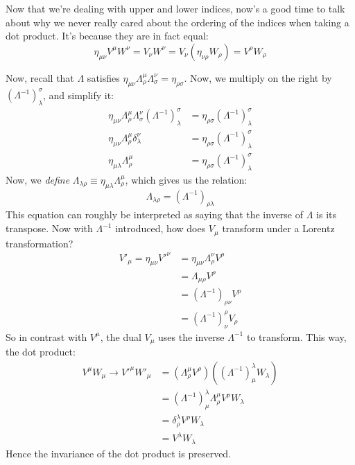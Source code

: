 \begin{aside}
	Now that we're dealing with upper and lower indices, now's a good time to talk about why we never really
	cared about the ordering of the indices when taking a dot product. It's because they are in fact equal:
	\[
		\eta_{\mu \nu} V^{\mu}W^{\nu} = V_{\nu}W^{\nu} = V_\nu(\eta_{\nu \rho} W_{\rho}) = V^{\rho}W_{\rho}
	\]
\end{aside}
Now, recall that \( \Lambda \) satisfies \( \eta_{\mu \nu} \Lambda^{\mu}_\rho \Lambda^{\nu}_{\sigma} =
\eta_{\rho \sigma} \). Now, we multiply on the right by \( (\Lambda^{-1})^{\sigma}_\lambda \), and simplify
it:
\begin{align*}
	\eta_{\mu \nu}\Lambda^{\mu}_{\rho}\Lambda^{\nu}_\sigma \left( \Lambda^{-1} \right)^{\sigma}_\lambda &=
	\eta_{\rho \sigma}\left( \Lambda^{-1} \right)^{\sigma}_\lambda\\
	\eta_{\mu \nu}\Lambda^{\mu}_\rho \delta^{\nu}_\lambda &= \eta_{\rho \sigma}
	\left(\Lambda^{-1}\right)^{\sigma}_\lambda\\
	\eta_{\mu \lambda} \Lambda^{\mu}_\rho &= \eta_{\rho \sigma}\left( \Lambda^{-1} \right)^{\sigma}_\lambda 
\end{align*}
Now, we \textit{define} \( \Lambda_{\lambda \rho} \equiv \eta_{\mu \lambda}\Lambda^{\mu}_\rho \), which gives
us the relation:
\begin{equation}
	\Lambda_{\lambda \rho} = \left( \Lambda^{-1} \right)_{\rho \lambda}
\end{equation}
This equation can roughly be interpreted as saying that the inverse of \( \Lambda \) is its transpose. Now
with \( \Lambda^{-1} \) introduced, how does \( V_{\mu} \) transform under a Lorentz transformation? 
\begin{align*}
	V'_{\mu} = \eta_{\mu \nu}V'^{\nu} &= \eta_{\mu \nu} \Lambda^{\nu}_\rho V^{\rho}\\
	&= \Lambda_{\mu \rho}V^{\rho} \\ 
	&= \left( \Lambda^{-1} \right)_{\rho \nu} V^{\rho} \\ 
	&= \left( \Lambda^{-1} \right)^{\rho}_\nu V_\rho
\end{align*}
So in contrast with \( V^{\mu} \), the dual \( V_{\mu} \) uses the inverse \( \Lambda^{-1} \) to transform.
This way, the dot product:
\begin{align*}
	V^{\mu}W_{\mu} \to V'^{\mu}W'_{\mu} &= \left( \Lambda^{\mu}_\rho V^{\rho} \right)\left( \left(
	\Lambda^{-1} \right)^{\lambda}_\mu W_\lambda \right)\\
	&= \left( \Lambda^{-1} \right)^{\lambda}_\mu \Lambda^{\mu}_\rho V^{\rho}W_\lambda \\ 
	&= \delta^{\lambda}_\rho V^{\rho}W_\lambda \\ 
	&= V^{\lambda}W_\lambda 
\end{align*}
Hence the invariance of the dot product is preserved.  
 

 






